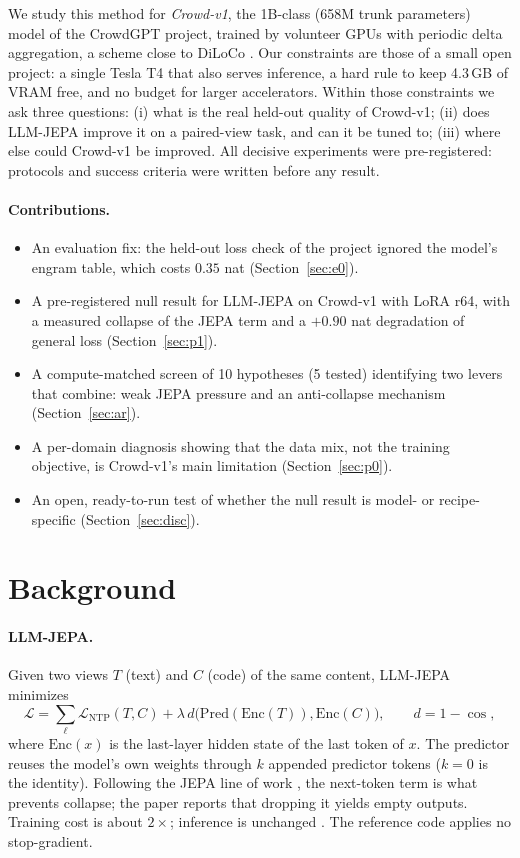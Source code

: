 \documentclass[11pt]{article}
\begin{document}
We study this method for \emph{Crowd-v1}, the 1B-class (658M trunk parameters) model of the CrowdGPT project, trained
by volunteer GPUs with periodic delta aggregation, a scheme close to DiLoCo \cite{douglas2023diloco}. Our constraints
are those of a small open project: a single Tesla T4 that also serves inference, a hard rule to keep 4.3\,GB of VRAM
free, and no budget for larger accelerators. Within those constraints we ask three questions:
(i) what is the real held-out quality of Crowd-v1;
(ii) does LLM-JEPA improve it on a paired-view task, and can it be tuned to;
(iii) where else could Crowd-v1 be improved.
All decisive experiments were pre-registered: protocols and success criteria were written before any result.

\paragraph{Contributions.}
\begin{itemize}
\item An evaluation fix: the held-out loss check of the project ignored the model's engram table, which costs
$0.35$ nat (Section~\ref{sec:e0}).
\item A pre-registered null result for LLM-JEPA on Crowd-v1 with LoRA r64, with a measured collapse of the JEPA term and
a $+0.90$ nat degradation of general loss (Section~\ref{sec:p1}).
\item A compute-matched screen of 10 hypotheses (5 tested) identifying two levers that combine: weak JEPA pressure and
an anti-collapse mechanism (Section~\ref{sec:ar}).
\item A per-domain diagnosis showing that the data mix, not the training objective, is Crowd-v1's main limitation
(Section~\ref{sec:p0}).
\item An open, ready-to-run test of whether the null result is model- or recipe-specific (Section~\ref{sec:disc}).
\end{itemize}

\section{Background}
\paragraph{LLM-JEPA.} Given two views $T$ (text) and $C$ (code) of the same content, LLM-JEPA minimizes
\begin{equation}
\mathcal{L} = \sum_\ell \mathcal{L}_{\text{NTP}}(T, C) + \lambda\, d\big(\mathrm{Pred}(\mathrm{Enc}(T)), \mathrm{Enc}(C)\big),
\qquad d = 1-\cos,
\end{equation}
where $\mathrm{Enc}(x)$ is the last-layer hidden state of the last token of $x$. The predictor reuses the model's own
weights through $k$ appended predictor tokens ($k=0$ is the identity). Following the JEPA line of work
\cite{lecun2022path,assran2023ijepa}, the next-token term is what prevents collapse; the paper reports that dropping it
yields empty outputs. Training cost is about $2\times$; inference is unchanged \cite{huang2025llmjepa}. The reference code
applies no stop-gradient.
\end{document}
